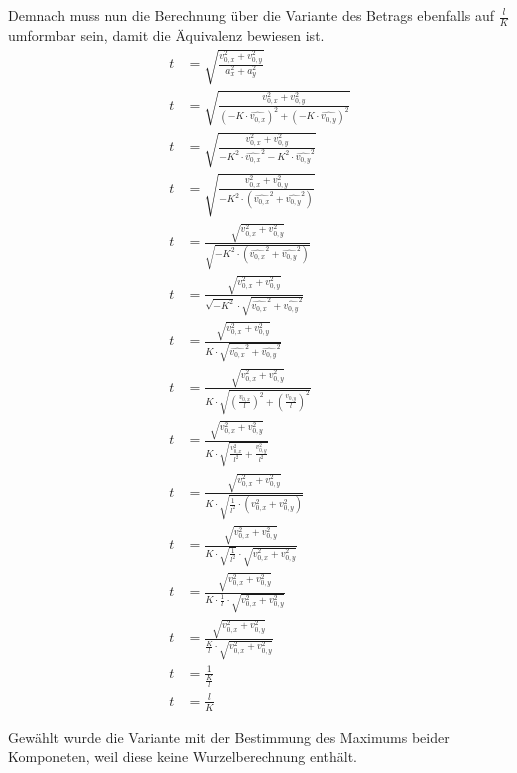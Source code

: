 Demnach muss nun die Berechnung über die Variante des Betrags ebenfalls auf $\frac{l}{K}$ umformbar sein, damit
die Äquivalenz bewiesen ist.
\begin{align}
    t &= \sqrt{\frac{v_{0,x}^2 + v_{0,y}^2}{a_x^2 + a_y^2}}\\
    t &= \sqrt{\frac{v_{0,x}^2 + v_{0,y}^2}{(-K \cdot \hat{v_{0,x}})^2 + (-K \cdot \hat{v_{0,y}})^2}}\\
    t &= \sqrt{\frac{v_{0,x}^2 + v_{0,y}^2}{-K^2 \cdot \hat{v_{0,x}}^2 -K^2 \cdot \hat{v_{0,y}}^2}}\\
    t &= \sqrt{\frac{v_{0,x}^2 + v_{0,y}^2}{-K^2 \cdot (\hat{v_{0,x}}^2 + \hat{v_{0,y}}^2)}}\\
    t &= \frac{\sqrt{v_{0,x}^2 + v_{0,y}^2}}{\sqrt{-K^2 \cdot (\hat{v_{0,x}}^2 + \hat{v_{0,y}}^2)}}\\
    t &= \frac{\sqrt{v_{0,x}^2 + v_{0,y}^2}}{\sqrt{-K^2} \cdot \sqrt{\hat{v_{0,x}}^2 + \hat{v_{0,y}}^2}}\\
    t &= \frac{\sqrt{v_{0,x}^2 + v_{0,y}^2}}{K \cdot \sqrt{\hat{v_{0,x}}^2 + \hat{v_{0,y}}^2}}\\
    t &= \frac{\sqrt{v_{0,x}^2 + v_{0,y}^2}}{K \cdot \sqrt{(\frac{v_{0,x}}{l})^2 + (\frac{v_{0,y}}{l})^2}}\\
    t &= \frac{\sqrt{v_{0,x}^2 + v_{0,y}^2}}{K \cdot \sqrt{\frac{v_{0,x}^2}{l^2} + \frac{v_{0,y}^2}{l^2}}}\\
    t &= \frac{\sqrt{v_{0,x}^2 + v_{0,y}^2}}{K \cdot \sqrt{\frac{1}{l^2} \cdot (v_{0,x}^2 + v_{0,y}^2)}}\\
    t &= \frac{\sqrt{v_{0,x}^2 + v_{0,y}^2}}{K \cdot \sqrt{\frac{1}{l^2}} \cdot \sqrt{v_{0,x}^2 + v_{0,y}^2}}\\
    t &= \frac{\sqrt{v_{0,x}^2 + v_{0,y}^2}}{K \cdot \frac{1}{l} \cdot \sqrt{v_{0,x}^2 + v_{0,y}^2}}\\
    t &= \frac{\sqrt{v_{0,x}^2 + v_{0,y}^2}}{\frac{K}{l} \cdot \sqrt{v_{0,x}^2 + v_{0,y}^2}}\\
    t &= \frac{1}{\frac{K}{l}}\\
    t &= \frac{l}{K}
\end{align}

Gewählt wurde die Variante mit der Bestimmung des Maximums beider Komponeten, weil diese keine Wurzelberechnung enthält.
